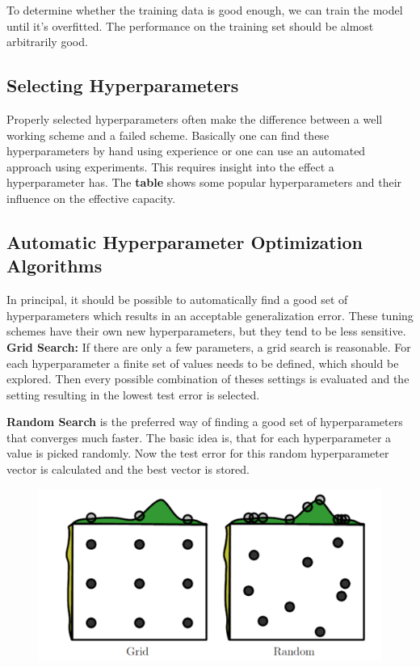 \begin{multicols}{2}
	To determine whether the training data is good enough, we can train the model until it's overfitted. The performance on the training set should be almost arbitrarily good.


	\subsection{Selecting Hyperparameters}
	Properly selected hyperparameters often make the difference between a well working scheme and a failed scheme.
	Basically one can find these hyperparameters by hand using experience or one can use an automated approach using experiments.
	This requires insight into the effect a hyperparameter has.
	The \textbf{table} shows some popular hyperparameters and their influence on the effective capacity.

	\subsection{Automatic Hyperparameter Optimization Algorithms}
	In principal, it should be possible to automatically find a good set of hyperparameters which results in an acceptable generalization error.
	These tuning schemes have their own new hyperparameters, but they tend to be less sensitive.\\

	\textbf{Grid Search: }If there are only a few parameters, a grid search is reasonable.
	For each hyperparameter a finite set of values needs to be defined, which should be explored.
	Then every possible combination of theses settings is evaluated and the setting resulting in the lowest test error is selected.

	\textbf{Random Search} is the preferred way of finding a good set of hyperparameters that converges much faster.
	The basic idea is, that for each hyperparameter a value is picked randomly.
	Now the test error for this random hyperparameter vector is calculated and the best vector is stored.

	\begin{figure}[H]
		\centering
		\includegraphics[width=0.75\linewidth]{images/gridrandom.PNG}
	\end{figure}


\end{multicols}
